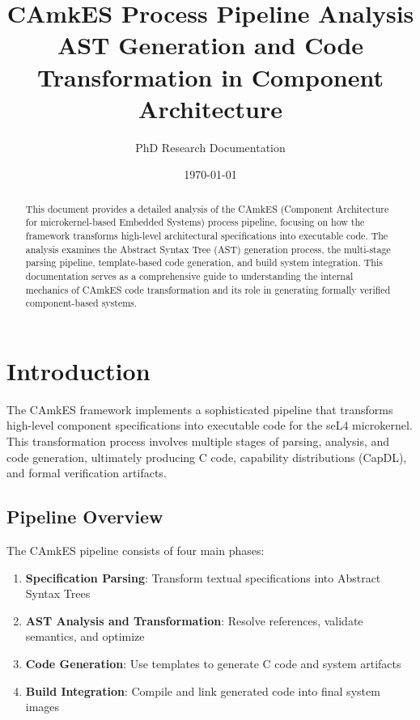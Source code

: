 \documentclass[12pt,a4paper]{article}
\title{\textbf{CAmkES Process Pipeline Analysis}\\
\large{AST Generation and Code Transformation in Component Architecture}}
\author{PhD Research Documentation}
\date{\today}
\begin{document}
\maketitle

\begin{abstract}
This document provides a detailed analysis of the CAmkES (Component Architecture for microkernel-based Embedded Systems) process pipeline, focusing on how the framework transforms high-level architectural specifications into executable code. The analysis examines the Abstract Syntax Tree (AST) generation process, the multi-stage parsing pipeline, template-based code generation, and build system integration. This documentation serves as a comprehensive guide to understanding the internal mechanics of CAmkES code transformation and its role in generating formally verified component-based systems.
\end{abstract}

\tableofcontents
\newpage

\section{Introduction}

The CAmkES framework implements a sophisticated pipeline that transforms high-level component specifications into executable code for the seL4 microkernel. This transformation process involves multiple stages of parsing, analysis, and code generation, ultimately producing C code, capability distributions (CapDL), and formal verification artifacts.

\subsection{Pipeline Overview}
The CAmkES pipeline consists of four main phases:
\begin{enumerate}
    \item \textbf{Specification Parsing}: Transform textual specifications into Abstract Syntax Trees
    \item \textbf{AST Analysis and Transformation}: Resolve references, validate semantics, and optimize
    \item \textbf{Code Generation}: Use templates to generate C code and system artifacts
    \item \textbf{Build Integration}: Compile and link generated code into final system images
\end{enumerate}
\end{document}
